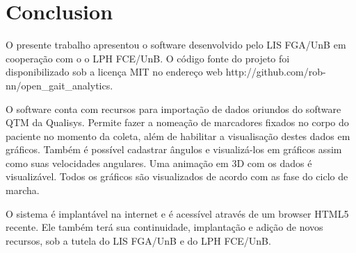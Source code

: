 \documentclass[journal]{IEEEtran}
\begin{document}



\section{Conclusion}
O presente trabalho apresentou o software desenvolvido pelo LIS FGA/UnB em cooperação com o o LPH FCE/UnB.
O código fonte do projeto foi disponibilizado sob a licença MIT \cite{MIT2015} no endereço web http://github.com/rob-nn/open\_gait\_analytics.

O software conta com recursos para importação de dados oriundos do software QTM da Qualisys.
Permite fazer a nomeação de marcadores fixados no corpo do paciente no momento da coleta, 
além de habilitar a visualisação destes dados em gráficos. Também é possível cadastrar ângulos
e visualizá-los em gráficos assim como suas velocidades angulares.
Uma animação em 3D com os dados é visualizável. Todos os gráficos são visualizados de acordo com 
as fase do ciclo de marcha.

O sistema é implantável na internet e é acessível através de um browser HTML5 recente.
Ele também terá sua continuidade, implantação e adição de novos recursos, sob a tutela do LIS FGA/UnB e 
do LPH FCE/UnB.






%
\end{document}
